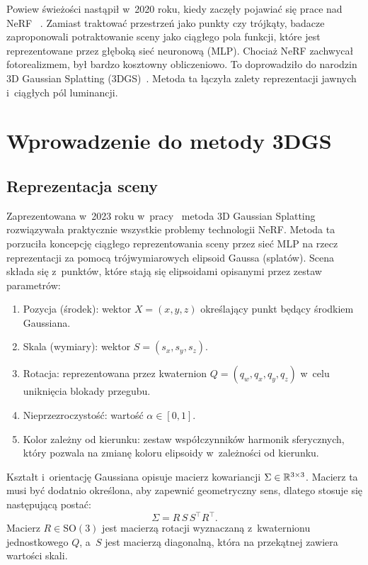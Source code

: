 Powiew świeżości nastąpił w~2020 roku, kiedy zaczęły pojawiać się prace nad
NeRF ~\cite{mildenhall2020nerf}. Zamiast traktować
przestrzeń jako punkty czy trójkąty, badacze zaproponowali potraktowanie sceny
jako ciągłego pola funkcji, które jest reprezentowane przez głęboką sieć
neuronową (MLP). Chociaż NeRF zachwycał fotorealizmem, był bardzo kosztowny
obliczeniowo. To doprowadziło do narodzin 3D Gaussian Splatting
(3DGS)~\cite{kerbl2023gaussian}. Metoda ta łączyła zalety reprezentacji
jawnych i~ciągłych pól luminancji.


\section{Wprowadzenie do metody 3DGS}
\label{sec:3dgs}

\subsection{Reprezentacja sceny}
\label{subsec:reprezentacja}

Zaprezentowana w~2023 roku w~pracy~\cite{kerbl2023gaussian} metoda
3D Gaussian Splatting rozwiązywała praktycznie wszystkie problemy technologii
NeRF. Metoda ta porzuciła koncepcję ciągłego reprezentowania sceny przez sieć
MLP na rzecz reprezentacji za pomocą trójwymiarowych elipsoid Gaussa (splatów).
Scena składa się z~punktów, które stają się elipsoidami opisanymi przez zestaw
parametrów:
\begin{enumerate}
  \item Pozycja (środek): wektor $X = (x, y, z)$ określający punkt będący
        środkiem Gaussiana.
  \item Skala (wymiary): wektor $S = (s_x, s_y, s_z)$.
  \item Rotacja: reprezentowana przez kwaternion $Q = (q_w, q_x, q_y, q_z)$
        w~celu uniknięcia blokady przegubu.
  \item Nieprzezroczystość: wartość $\alpha \in [0, 1]$.
  \item Kolor zależny od kierunku: zestaw współczynników harmonik sferycznych,
        który pozwala na zmianę koloru elipsoidy w~zależności od kierunku.
\end{enumerate}

Kształt i~orientację Gaussiana opisuje macierz kowariancji
$\Sigma \in \mathbb{R}^{3 \times 3}$. Macierz ta musi być dodatnio określona, aby
zapewnić geometryczny sens, dlatego stosuje się następującą postać:
\begin{equation}
  \Sigma = R\,S\,S^{\top} R^{\top}.
  \label{eq:kowariancja}
\end{equation}
Macierz $R \in \mathrm{SO}(3)$ jest macierzą rotacji wyznaczaną z~kwaternionu
jednostkowego $Q$, a~$S$ jest macierzą diagonalną, która na przekątnej zawiera
wartości skali.

